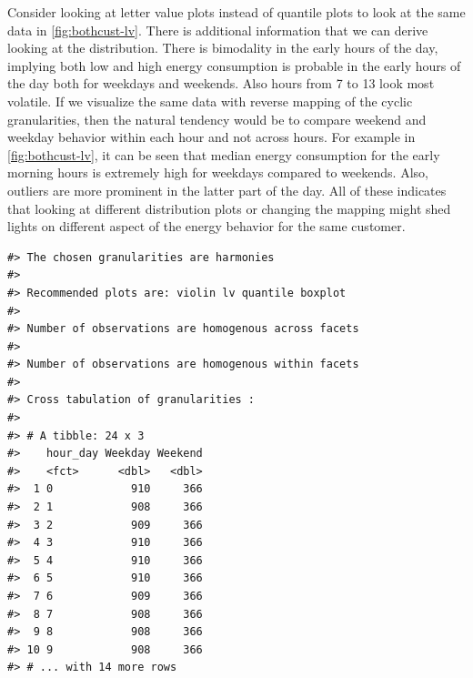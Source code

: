\documentclass[12pt]{article}
\newenvironment{Shaded}{\begin{snugshade}}{\end{snugshade}}
\newcommand{\DecValTok}[1]{\textcolor[rgb]{0.00,0.00,0.81}{#1}}
\newcommand{\KeywordTok}[1]{\textcolor[rgb]{0.13,0.29,0.53}{\textbf{#1}}}
\newcommand{\NormalTok}[1]{#1}
\newcommand{\OperatorTok}[1]{\textcolor[rgb]{0.81,0.36,0.00}{\textbf{#1}}}
\newcommand{\StringTok}[1]{\textcolor[rgb]{0.31,0.60,0.02}{#1}}
\begin{document}
Consider looking at letter value plots instead of quantile plots to look at the same data in \autoref{fig:bothcust-lv}. There is additional information that we can derive looking at the distribution.
There is bimodality in the early hours of the day, implying both low and high energy consumption is probable in the early hours of the day both for weekdays and weekends. Also hours from 7 to 13 look most volatile. If we visualize the same data with reverse mapping of the cyclic granularities, then the natural tendency would be to compare weekend and weekday behavior within each hour and not across hours. For example in \autoref{fig:bothcust-lv}, it can be seen that median energy consumption for the early morning hours is extremely high for weekdays compared to weekends. Also, outliers are more prominent in the latter part of the day. All of these indicates that looking at different distribution plots or changing the mapping might shed lights on different aspect of the energy behavior for the same customer.

\begin{Shaded}
\end{Shaded}

\begin{verbatim}
#> The chosen granularities are harmonies 
#>  
#> Recommended plots are: violin lv quantile boxplot 
#>  
#> Number of observations are homogenous across facets 
#>  
#> Number of observations are homogenous within facets 
#>  
#> Cross tabulation of granularities : 
#>  
#> # A tibble: 24 x 3
#>    hour_day Weekday Weekend
#>    <fct>      <dbl>   <dbl>
#>  1 0            910     366
#>  2 1            908     366
#>  3 2            909     366
#>  4 3            910     366
#>  5 4            910     366
#>  6 5            910     366
#>  7 6            909     366
#>  8 7            908     366
#>  9 8            908     366
#> 10 9            908     366
#> # ... with 14 more rows
\end{verbatim}
\end{document}
